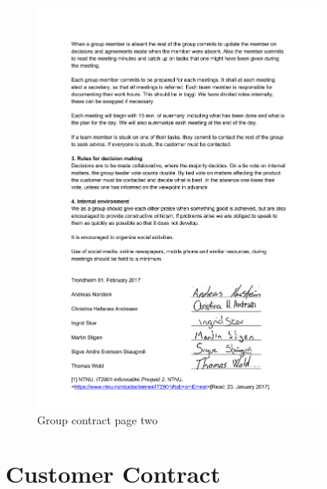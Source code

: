 \begin{figure}[H]
\centering
    \includegraphics[width=0.85\textwidth]{fig/GroupContract2.pdf}
    \caption{Group contract page two}
    \label{Group_Contract_2}
\end{figure}

\section{Customer Contract}
\label{customer_contract}

